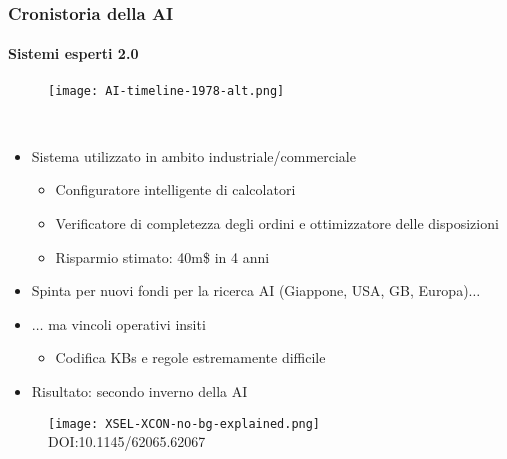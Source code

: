 %
\begin{frame}[t] \frametitle{Cronistoria della AI}
{\scriptsize
{}
\framesubtitle{Sistemi esperti 2.0}
\vspace*{-.5cm}
	\begin{minipage}[t]{\textwidth}
		\begin{figure}[ht]
			\centering
			\texttt{[image: AI-timeline-1978-alt.png]}
		\end{figure}
	\end{minipage}
	\\\vspace*{.3cm}
	\begin{minipage}[t]{\textwidth}
		\begin{minipage}[t]{0.6\textwidth}
			\begin{itemize}[leftmargin=10pt,align=right]
				\onslide<2->\item[\alert{\faHandORight}] Sistema utilizzato in ambito \alert{industriale/commerciale}
				\begin{itemize}[leftmargin=10pt,align=right]
					\onslide<3->\item[\alert{\faHandORight}] Configuratore intelligente di calcolatori
					\item[\alert{\faHandORight}] Verificatore di completezza degli ordini e ottimizzatore delle disposizioni
					\item[\alert{\faHandORight}] Risparmio stimato: 40m\$ in 4 anni
				\end{itemize}
				\item[\alert{\faHandORight}] Spinta per nuovi fondi per la ricerca AI (Giappone, USA, GB, Europa)$\ldots$
				\onslide<5->\item[\alert{\faHandORight}]$\ldots$ ma vincoli operativi insiti
				\begin{itemize}[leftmargin=10pt,align=right]
					\item[\alert{\faHandORight}] Codifica KBs e regole estremamente difficile
				\end{itemize}
				\item[\alert{\faHandORight}] Risultato: \alert{secondo inverno della AI}
			\end{itemize}
		\end{minipage}
		\begin{minipage}[t]{0.4\textwidth}
			\centering
			\begin{figure}[ht]
				\texttt{[image: XSEL-XCON-no-bg-explained.png]}
				\\\textsuperscript{\textcopyright}DOI:10.1145/62065.62067
			\end{figure}
		\end{minipage}
	\end{minipage}
}
\end{frame}
